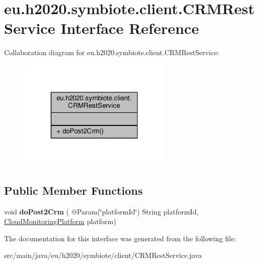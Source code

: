 \hypertarget{interfaceeu_1_1h2020_1_1symbiote_1_1client_1_1CRMRestService}{}\section{eu.\+h2020.\+symbiote.\+client.\+C\+R\+M\+Rest\+Service Interface Reference}
\label{interfaceeu_1_1h2020_1_1symbiote_1_1client_1_1CRMRestService}


Collaboration diagram for eu.\+h2020.\+symbiote.\+client.\+C\+R\+M\+Rest\+Service\+:\nopagebreak
\begin{figure}[H]
\begin{center}
\leavevmode
\includegraphics[width=208pt]{interfaceeu_1_1h2020_1_1symbiote_1_1client_1_1CRMRestService__coll__graph}
\end{center}
\end{figure}
\subsection*{Public Member Functions}
\begin{DoxyCompactItemize}
\item 
\mbox{\label{interfaceeu_1_1h2020_1_1symbiote_1_1client_1_1CRMRestService_a76472b7b18053e469e940877f2b53a93}} 
void {\bfseries do\+Post2\+Crm} ( @Param(\char`\"{}platform\+Id\char`\"{}) String platform\+Id, \hyperlink{classeu_1_1h2020_1_1symbiote_1_1cloud_1_1monitoring_1_1model_1_1CloudMonitoringPlatform}{Cloud\+Monitoring\+Platform} platform)
\end{DoxyCompactItemize}


The documentation for this interface was generated from the following file\+:\begin{DoxyCompactItemize}
\item 
src/main/java/eu/h2020/symbiote/client/C\+R\+M\+Rest\+Service.\+java\end{DoxyCompactItemize}
